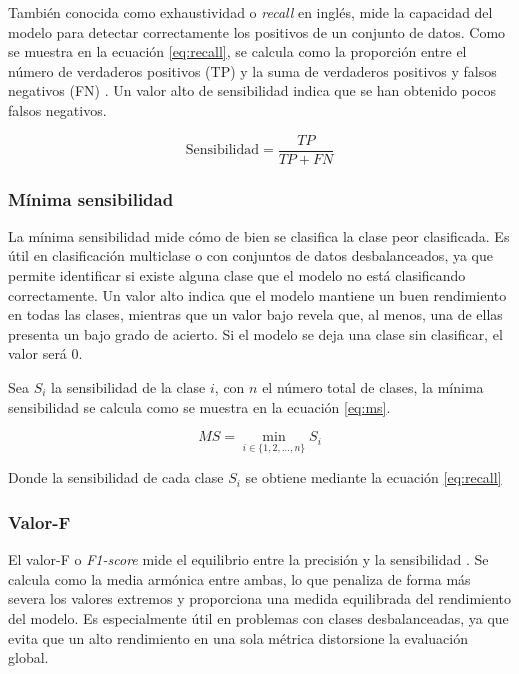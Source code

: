 También conocida como exhaustividad o \textit{recall} en inglés, mide la capacidad del modelo para detectar correctamente los positivos de un conjunto de datos. Como se muestra en la ecuación \ref{eq:recall}, se calcula como la proporción entre el número de verdaderos positivos (TP) y la suma de verdaderos positivos y falsos negativos (FN) \cite{metrics}. Un valor alto de sensibilidad indica que se han obtenido pocos falsos negativos.

\begin{equation}
	\label{eq:recall}
	\text{Sensibilidad} = \frac{TP}{TP + FN}
\end{equation}

\subsubsection{Mínima sensibilidad}
\label{subsubsec:ms}

La mínima sensibilidad mide cómo de bien se clasifica la clase peor clasificada. Es útil en clasificación multiclase o con conjuntos de datos desbalanceados, ya que permite identificar si existe alguna clase que el modelo no está clasificando correctamente. Un valor alto indica que el modelo mantiene un buen rendimiento en todas las clases, mientras que un valor bajo revela que, al menos, una de ellas presenta un bajo grado de acierto. Si el modelo se deja una clase sin clasificar, el valor será 0.

\vspace{1em}

Sea \( S_i \) la sensibilidad de la clase \( i \), con \( n \) el número total de clases, la mínima sensibilidad se calcula como se muestra en la ecuación \ref{eq:ms}.

\begin{equation}
	MS = \min_{i \in \{1, 2, \dots, n\}} S_i
	\label{eq:ms}
\end{equation}

Donde la sensibilidad de cada clase \( S_i \) se obtiene mediante la ecuación \ref{eq:recall}

\subsubsection{Valor-F}
\label{subsubsec:f1}

El valor-F o \textit{F1-score} mide el equilibrio entre la precisión y la sensibilidad \cite{metrics}. Se calcula como la media armónica entre ambas, lo que penaliza de forma más severa los valores extremos y proporciona una medida equilibrada del rendimiento del modelo. Es especialmente útil en problemas con clases desbalanceadas, ya que evita que un alto rendimiento en una sola métrica distorsione la evaluación global.

